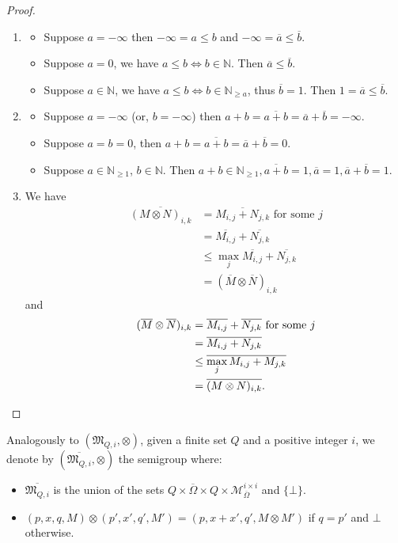 \documentclass[10pt,a4paper]{amsart}
\theoremstyle{definition}
\numberwithin{equation}{section}
\theoremstyle{remark}
\newcommand{\N}{\mathbb{N}}
\newcommand{\ideal}{\mathfrak{M}}
\newcommand{\matricesOmbar}[2]{\mathcal{M}_{\overline{\Omega}}^{#1\times #2}}
\theoremstyle{remark}
\begin{document}
\begin{proof}\hfill
\begin{enumerate}[label={\normalfont(\arabic*)}]
\item
\begin{itemize}
\item Suppose $a = -\infty$ then $-\infty  = a\le b$ and $-\infty=\overline{a}\le \overline{b}$.
\item Suppose $a= 0$, we have $a\le b \iff b\in\N$. Then $\overline{a} \le \overline{b}$. 
\item Suppose $a\in \N$, we have $a\le b \iff b\in \N_{\ge a}$, thus $\overline{b} = 1$. Then $1 = \overline{a} \le \overline{b}$.
\end{itemize}
\item
\begin{itemize}
\item  Suppose $a=-\infty$ (or, $b = -\infty$) then $a+b = \overline{a+b} = \overline{a} + \overline{b} = -\infty$.
\item Suppose $a=b=0$, then $a+ b= \overline{a+b} = \overline{a} + \overline{b} = 0$.
\item Suppose $a\in \mathbb{N}_{\ge 1}$, $b\in\N$. Then $a+b \in \mathbb{N}_{\ge 1}, \overline{a+b} = 1, \overline{a} = 1, \overline{a} + \overline{b} = 1$.
\end{itemize}
    \item We have \begin{align*}\qquad\overline{(M\otimes N)_{i,k}} &= \overline{M_{i,j} + N_{j,k}} \text{ for some } j
     \\&= \overline{M_{i,j}} + \overline{N_{j,k}} 
     \\&\le \max_{j}  \overline{M_{i,j}} + \overline{N_{j,k}}  
     \\&= (\overline{M}\otimes\overline{N})_{i,k}\end{align*}
    and
    \begin{align*}\qquad(\overline{M}\otimes\overline{N})_{i,k} &=  \overline{M_{i,j}} + \overline{N_{j,k}}  \text{ for some } j
    \\&= \overline{M_{i,j} + N_{j,k}}  
    \\&\le \overline{\max_{j} M_{i,j} + M_{j,k}} 
    \\&= \overline{(M\otimes N)_{i,k}}.\qedhere\end{align*}
\end{enumerate}
\end{proof}

Analogously to $(\ideal_{Q,i}, \otimes)$, given a finite set $Q$ and a positive integer $i$, we denote by $(\overline{\ideal_{Q,i}}, \otimes)$ the semigroup where:
\begin{itemize}
\item $\overline{\ideal_{Q,i}}$ is the union of the sets $Q \times \overline{\Omega} \times Q \times \matricesOmbar{i}{i}$ and $\{\bot\}$.
\item $(p,x,q,M)\otimes(p',x',q',M') = (p,x + x',q', M\otimes M')$ if $q = p'$ and $\bot$ otherwise.
\end{itemize}
\end{document}
